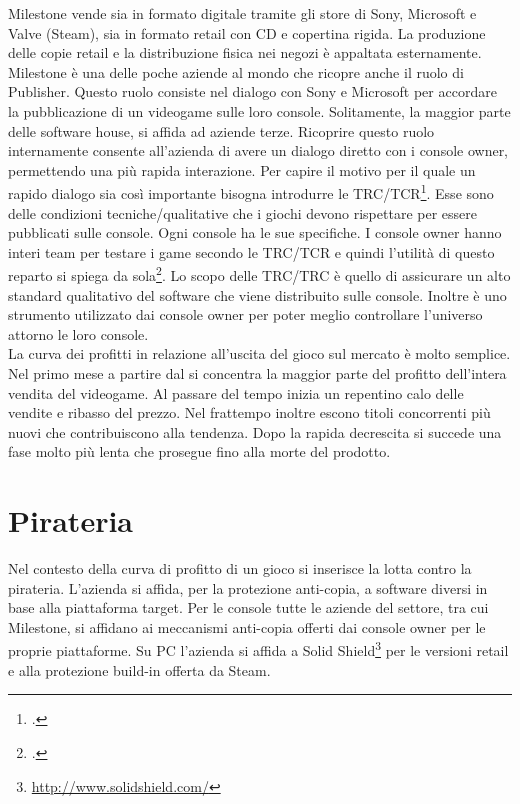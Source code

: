 Milestone vende sia in formato digitale tramite gli store di Sony, Microsoft e Valve (Steam), sia in formato retail con CD e copertina rigida. La produzione delle copie retail e la distribuzione fisica nei negozi è appaltata esternamente.\\

Milestone è una delle poche aziende al mondo che ricopre anche il ruolo di Publisher. Questo ruolo consiste nel dialogo con Sony e Microsoft per accordare la pubblicazione di un videogame sulle loro console. Solitamente, la maggior parte delle software house, si affida ad aziende terze. Ricoprire questo ruolo internamente consente all'azienda di avere un dialogo diretto con i console owner, permettendo una più rapida interazione. Per capire il motivo per il quale un rapido dialogo sia così importante bisogna introdurre le TRC/TCR\footcite{site:approfondimento-TRC}. Esse sono delle condizioni tecniche/qualitative che i giochi devono rispettare per essere pubblicati sulle console. Ogni console ha le sue specifiche. I console owner hanno interi team per testare i game secondo le TRC/TCR e quindi l'utilità di questo reparto si spiega da sola\footcite{site:approfondimento-game-testing}. Lo scopo delle TRC/TRC è quello di assicurare un alto standard qualitativo del software che viene distribuito sulle console. Inoltre è uno strumento utilizzato dai console owner per poter meglio controllare l'universo attorno le loro console.\\

La curva dei profitti in relazione all'uscita del gioco sul mercato è molto semplice. Nel primo mese a partire dal  si concentra la maggior parte del profitto dell'intera vendita del videogame. Al passare del tempo inizia un repentino calo delle vendite e ribasso del prezzo. Nel frattempo inoltre escono titoli concorrenti più nuovi che contribuiscono alla tendenza. Dopo la rapida decrescita si succede una fase molto più lenta che prosegue fino alla morte del prodotto.


\section{Pirateria}

Nel contesto della curva di profitto di un gioco si inserisce la lotta contro la pirateria. L'azienda si affida, per la protezione anti-copia, a software diversi in base alla piattaforma target. Per le console tutte le aziende del settore, tra cui Milestone, si affidano ai meccanismi anti-copia offerti dai console owner per le proprie piattaforme. Su PC l'azienda si affida a Solid Shield\footnote{\url{http://www.solidshield.com/}} per le versioni retail e alla protezione build-in offerta da Steam.\\

